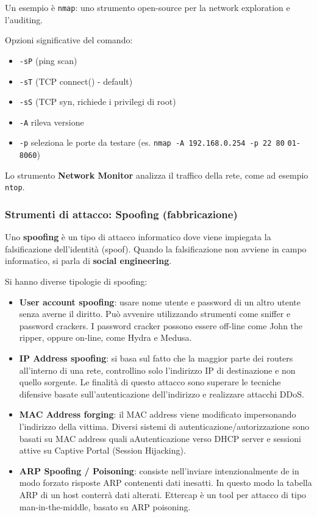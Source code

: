             Un esempio è \verb|nmap|: uno strumento open-source per la network exploration e l'auditing.
        
            Opzioni significative del comando:
            \begin{itemize}
                \item \verb|-sP| (ping scan)
                \item \verb|-sT| (TCP connect() - default)
                \item \verb|-sS| (TCP syn, richiede i privilegi di root)
                \item \verb|-A| rileva versione
                \item \verb|-p| seleziona le porte da testare (es. \verb|nmap -A 192.168.0.254 -p 22 80| \verb|01-8060|)
            \end{itemize}

            Lo strumento \textbf{Network Monitor} analizza il traffico della rete, come ad esempio \verb|ntop|.

        \subsubsection{Strumenti di attacco: Spoofing (fabbricazione)}
            Uno \textbf{spoofing} è un tipo di attacco informatico dove viene impiegata la falsificazione dell'identità (spoof). Quando la falsificazione non avviene in campo informatico, si parla di \textbf{social engineering}.
        
            Si hanno diverse tipologie di spoofing:
            \begin{itemize}
                \item \textbf{User account spoofing}: usare nome utente e password di un altro utente senza averne il diritto. Può avvenire utilizzando strumenti come sniffer e password crackers. I password cracker possono essere off-line come John the ripper, oppure on-line, come Hydra e Medusa.
                \item \textbf{IP Address spoofing}: si basa sul fatto che la maggior parte dei routers all'interno di una rete, controllino solo l'indirizzo IP di destinazione e non quello sorgente. Le finalità di questo attacco sono superare le tecniche difensive basate sull'autenticazione dell'indirizzo e realizzare attacchi DDoS.
                \item \textbf{MAC Address forging}: il MAC address viene modificato impersonando l'indirizzo della vittima. Diversi sistemi di autenticazione/autorizzazione sono basati su MAC address quali aAutenticazione verso DHCP server e sessioni attive su Captive Portal (Session Hijacking).
                \item \textbf{ARP Spoofing / Poisoning}: consiste nell'inviare intenzionalmente de in modo forzato risposte ARP contenenti dati inesatti. In questo modo la tabella ARP di un host conterrà dati alterati. Ettercap è un tool per attacco di tipo man-in-the-middle, basato su ARP poisoning.
            \end{itemize}

